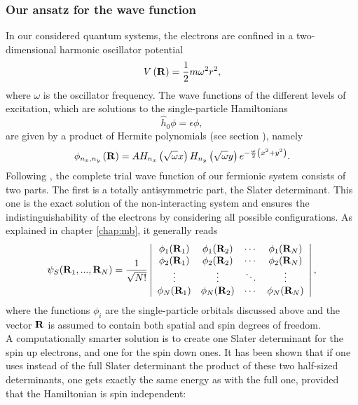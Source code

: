 \subsubsection{Our ansatz for the wave function}
In our considered quantum systems, the electrons are confined in a two-dimensional harmonic oscillator potential
\[
V\left(\mathbf{R}\right) = \frac{1}{2} m \omega^2 r^2,
\]
where $\omega$ is the oscillator frequency. The wave functions of the different levels of excitation, which are solutions to the single-particle Hamiltonians
\[
\hat{h}_0 \phi = \epsilon \phi,
\]
are given by a product of Hermite polynomials (see section \label{sec:HO}), namely
\[
\phi_{n_x,n_y}\left(\mathbf{R}\right) = A H_{n_x}\left(\sqrt{\omega}x\right) H_{n_y}\left(\sqrt{\omega}y\right) e^{-\frac{\omega}{2}\left(x^2+y^2\right)}.
\]
Following \cite{SkriptMorten}, the complete trial wave function of our fermionic system consists of two parts. The first is a totally antisymmetric part, the Slater determinant. This one is the exact solution of the non-interacting system and ensures the indistinguishability of the electrons by considering all possible configurations. As explained in chapter \ref{chap:mb}, it generally reads
\begin{equation}
\psi_S(\rf_1, ...,\rf_N) =\frac{1}{\sqrt{N!}} \left|\begin{array}{cccc}
                           \phi_1(\rf_1) & \phi_1(\rf_2) &\cdots   & \phi_1(\rf_N) \\
                           \phi_2(\rf_1) & \phi_2(\rf_2) &\cdots & \phi_2(\rf_N) \\
                           \vdots & \vdots & \ddots & \vdots\\
                       \phi_N(\rf_1)&\phi_N(\rf_2)   &  \cdots & \phi_N(\rf_N) \\
                      \end{array} \right|,
\label{eq:Slater}
\end{equation}
where the functions $\phi_i$ are the single-particle orbitals discussed above and the vector $\mathbf{R}$ is assumed to contain both spatial and spin degrees of freedom.\\
A computationally smarter solution is to create one Slater determinant for the spin up electrons, and one for the spin down ones. It has been shown \cite{Nissenbaum2008} that if one uses instead of the full Slater determinant the product of these two half-sized determinants, one gets exactly the same energy as with the full one, provided that the Hamiltonian is spin independent:
